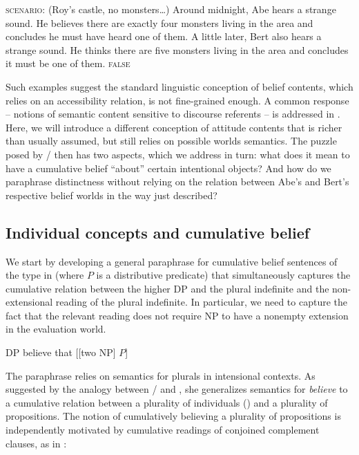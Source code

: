 \documentclass[output=paper]{langscibook}
\begin{document}
\eanoraggedright
\label{sch-has:ex:22} \textsc{scenario:} (Roy's castle, no monsters\ldots) Around midnight, Abe hears a strange sound. He believes there are exactly four monsters living in the area and concludes he must have heard one of them. A little later, Bert also hears a strange sound. He thinks there are five monsters living in the area and concludes it must be one of them. \hfill {} \textsc{false}
\z

\noindent Such examples suggest the standard linguistic conception of belief contents, which relies on an accessibility relation, is not fine-grained enough. A  common response  -- notions of semantic content sensitive to discourse referents -- is addressed in . Here, we will introduce a different conception of attitude contents that is richer than usually assumed, but still relies on possible worlds semantics. The puzzle posed by / then has two aspects, which we address in turn: what does it mean to have a cumulative belief ``about'' certain intentional objects? And how do we paraphrase distinctness without relying on the relation between Abe's and Bert's respective belief worlds in the way just described?


\subsection{Individual concepts and cumulative belief}\label{sch-has:sec:3.2}

We start by developing a general paraphrase for cumulative belief sentences of the type in  (where $P$ is a distributive predicate) that simultaneously captures the cumulative relation between the higher DP and the plural indefinite and the non-extensional reading of the plural indefinite. In particular, we need to capture the fact that the relevant reading does not require NP to have a nonempty extension in the evaluation world.

\ea\label{sch-has:ex:23} DP believe that [[two NP] $P$] \z

\noindent The paraphrase relies on  semantics for plurals in intensional contexts. As suggested by the analogy between / and , she generalizes  semantics for \textit{believe} to a cumulative relation between a plurality of individuals () and a plurality of propositions. The notion of cumulatively believing a plurality of propositions is independently motivated by cumulative readings of conjoined complement clauses, as in :
\end{document}
